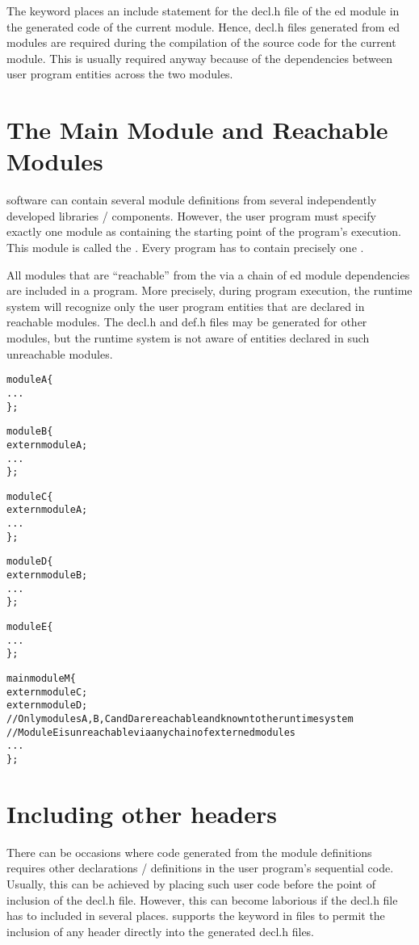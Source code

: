 The  keyword places an include statement for the decl.h file of the
ed module in the generated code of the current module. Hence,
decl.h files generated from ed modules are required during the
compilation of the source code for the current module. This is usually required
anyway because of the dependencies between user program entities across the two
modules.

\section{The Main Module and Reachable Modules}

\charm software can contain several module definitions from several
independently developed libraries / components. However, the user program must
specify exactly one module as containing the starting point of the program's
execution. This module is called the . Every \charm program
has to contain precisely one .

All modules that are ``reachable'' from the  via a chain of
ed module dependencies are included in a \charm program. More
precisely, during program execution, the \charm runtime system will recognize
only the user program entities that are declared in reachable modules. The
decl.h and def.h files may be generated for other modules, but the runtime
system is not aware of entities declared in such unreachable modules.

\begin{alltt}
module A \{
    ...
\};

module B \{
    extern module A;
    ...
\};

module C \{
    extern module A;
    ...
\};

module D \{
    extern module B;
    ...
\};

module E \{
    ...
\};

mainmodule M \{
    extern module C;
    extern module D;
    // Only modules A, B, C and D are reachable and known to the runtime system
    // Module E is unreachable via any chain of externed modules
    ...
\};
\end{alltt}


\section{Including other headers}

There can be occasions where code generated from the module definitions
requires other declarations / definitions in the user program's sequential
code. Usually, this can be achieved by placing such user code before the point
of inclusion of the decl.h file. However, this can become laborious if the
decl.h file has to included in several places. \charm supports the keyword
 in \ci files to permit the inclusion of any header directly into
the generated decl.h files.

